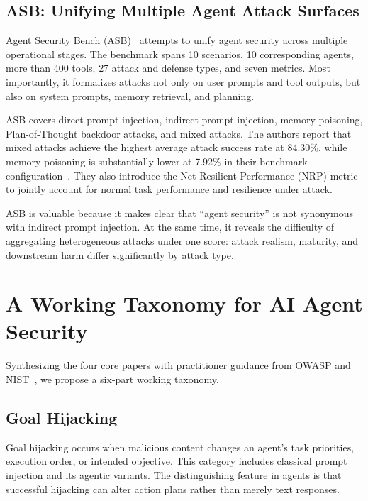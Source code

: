 \documentclass[conference]{IEEEtran}
\begin{document}
\subsection{ASB: Unifying Multiple Agent Attack Surfaces}

Agent Security Bench (ASB)~\cite{zhang2025asb} attempts to unify agent security across multiple operational stages. The benchmark spans 10 scenarios, 10 corresponding agents, more than 400 tools, 27 attack and defense types, and seven metrics. Most importantly, it formalizes attacks not only on user prompts and tool outputs, but also on system prompts, memory retrieval, and planning.

ASB covers direct prompt injection, indirect prompt injection, memory poisoning, Plan-of-Thought backdoor attacks, and mixed attacks. The authors report that mixed attacks achieve the highest average attack success rate at 84.30\%, while memory poisoning is substantially lower at 7.92\% in their benchmark configuration~\cite{zhang2025asb}. They also introduce the Net Resilient Performance (NRP) metric to jointly account for normal task performance and resilience under attack.

ASB is valuable because it makes clear that ``agent security'' is not synonymous with indirect prompt injection. At the same time, it reveals the difficulty of aggregating heterogeneous attacks under one score: attack realism, maturity, and downstream harm differ significantly by attack type.

\section{A Working Taxonomy for AI Agent Security}

Synthesizing the four core papers with practitioner guidance from OWASP and NIST~\cite{owaspAgenticThreats,owaspAgenticApps,owaspSkills,nist6001}, we propose a six-part working taxonomy.

\subsection{Goal Hijacking}

Goal hijacking occurs when malicious content changes an agent's task priorities, execution order, or intended objective. This category includes classical prompt injection and its agentic variants. The distinguishing feature in agents is that successful hijacking can alter action plans rather than merely text responses.
\end{document}
